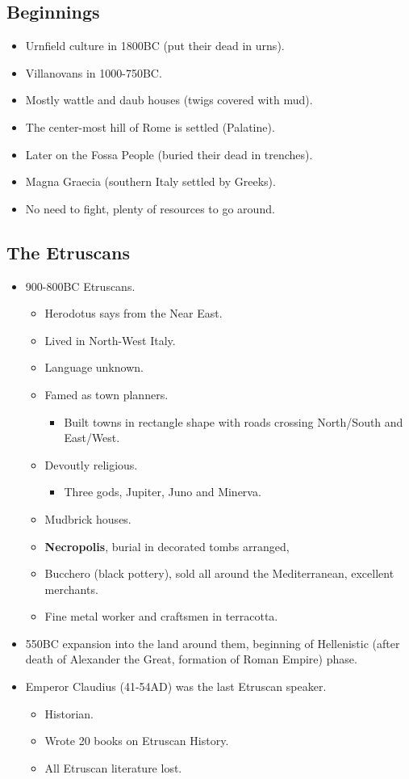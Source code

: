 \documentclass[12pt, twoside]{article}
\begin{document}
\subsection{Beginnings}
\begin{itemize}
\item Urnfield culture in 1800BC (put their dead in urns).
\item Villanovans in 1000-750BC.
\item Mostly wattle and daub houses (twigs covered with mud).
\item The center-most hill of Rome is settled (Palatine).
\item Later on the Fossa People (buried their dead in trenches).
\item Magna Graecia (southern Italy settled by Greeks).
\item No need to fight, plenty of resources to go around.
\end{itemize}

\subsection{The Etruscans}
\begin{itemize}
\item 900-800BC Etruscans.
	\begin{itemize}
	\item Herodotus says from the Near East.
	\item Lived in North-West Italy.
	\item Language unknown.
	\item Famed as town planners.
		\begin{itemize}
		\item Built towns in rectangle shape with roads crossing North/South and East/West.
		\end{itemize}
	\item Devoutly religious.
		\begin{itemize}
		\item Three gods, Jupiter, Juno and Minerva.
		\end{itemize}
	\item Mudbrick houses.
	\item \textbf{Necropolis}, burial in decorated tombs arranged,
	\item Bucchero (black pottery), sold all around the Mediterranean, excellent merchants.
	\item Fine metal worker and craftsmen in terracotta.
	\end{itemize}
\item 550BC expansion into the land around them, beginning of Hellenistic (after death of Alexander the Great, formation of Roman Empire) phase.
\item Emperor Claudius (41-54AD) was the last Etruscan speaker.
	\begin{itemize}
	\item Historian.
	\item Wrote 20 books on Etruscan History.
	\item All Etruscan literature lost.
	\end{itemize}
\end{itemize}
\end{document}
